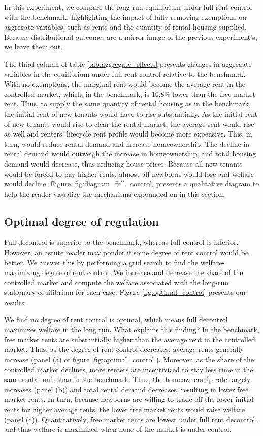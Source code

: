 \documentclass[parskip=full]{article}
\begin{document}
In this experiment, we compare the long-run equilibrium under full rent control with the benchmark, highlighting the impact of fully removing exemptions on aggregate variables, such as rents and the quantity of rental housing supplied. Because distributional outcomes are a mirror image of the previous experiment's, we leave them out.

The third column of table \ref{tab:aggregate_effects} presents changes in aggregate variables in the equilibrium under full rent control relative to the benchmark. With no exemptions, the marginal rent would become the average rent in the controlled market, which, in the benchmark, is 16.8\% lower than the free market rent. Thus, to supply the same quantity of rental housing as in the benchmark, the initial rent of new tenants would have to rise substantially. As the initial rent of new tenants would rise to clear the rental market, the average rent would rise as well and renters' lifecycle rent profile would become more expensive. This, in turn, would reduce rental demand and increase homeownership. The decline in rental demand would outweigh the increase in homeownership, and total housing demand would decrease, thus reducing house prices. Because all new tenants would be forced to pay higher rents, almost all newborns would lose and welfare would decline. Figure \ref{fig:diagram_full_control} presents a qualitative diagram to help the reader visualize the mechanisms expounded on in this section. 

\subsection{Optimal degree of regulation}\label{subsection:optimal_control}

Full decontrol is superior to the benchmark, whereas full control is inferior. However, an astute reader may ponder if some degree of rent control would be better. We answer this by performing a grid search to find the welfare-maximizing degree of rent control. We increase and decrease the share of the controlled market and compute the welfare associated with the long-run stationary equilibrium for each case. Figure \ref{fig:optimal_control} presents our results.

We find no degree of rent control is optimal, which means full decontrol maximizes welfare in the long run. What explains this finding? In the benchmark, free market rents are substantially higher than the average rent in the controlled market. Thus, as the degree of rent control decreases, average rents generally increase (panel (a) of figure \ref{fig:optimal_control}). Moreover, as the share of the controlled market declines, more renters are incentivized to stay less time in the same rental unit than in the benchmark. Thus, the homeownership rate largely increases (panel (b)) and total rental demand decreases, resulting in lower free market rents. In turn, because newborns are willing to trade off the lower initial rents for higher average rents, the lower free market rents would raise welfare (panel (c)). Quantitatively, free market rents are lowest under full rent decontrol, and thus welfare is maximized when none of the market is under control.
\end{document}
